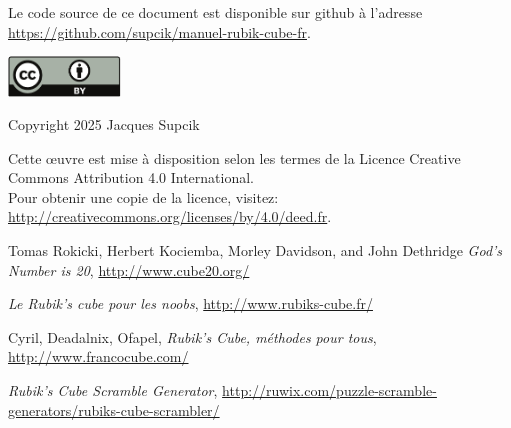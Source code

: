 \documentclass[10pt,paper=a5,pagesize]{scrbook}
\begin{document}
\frontmatter
\thispagestyle{empty}

\begin{titlepage}

\end{titlepage}

\thispagestyle{empty}
\null
\vfill

Le code source de ce document est disponible sur github à l'adresse\\
\url{https://github.com/supcik/manuel-rubik-cube-fr}.
\par\vspace*{8mm}

\begin{minipage}[c]{\textwidth}
\begin{versionhistory}
\end{versionhistory}
\end{minipage}
\par\vspace*{10mm}


\includegraphics[width=30mm]{by.pdf}

Copyright \textcopyright{} 2025 Jacques Supcik

Cette œuvre est mise à disposition selon les termes de la Licence Creative Commons Attribution 4.0 International.
\medskip\\
Pour obtenir une copie de la licence, visitez:\\
\url{http://creativecommons.org/licenses/by/4.0/deed.fr}.
\newpage

\tableofcontents

\mainmatter







\backmatter
\begin{thebibliography}{9}
	
	 Tomas Rokicki, Herbert Kociemba, Morley Davidson, and John Dethridge
	\emph{God's Number is 20},
	\url{http://www.cube20.org/}

	\emph{Le Rubik's cube pour les noobs},
	\url{http://www.rubiks-cube.fr/}

	Cyril, Deadalnix, Ofapel,
	\emph{Rubik's Cube, méthodes pour tous},
	\url{http://www.francocube.com/}
	
	\emph{Rubik’s Cube Scramble Generator},
	\url{http://ruwix.com/puzzle-scramble-generators/rubiks-cube-scrambler/}
	
	
\end{thebibliography}
\end{document}
